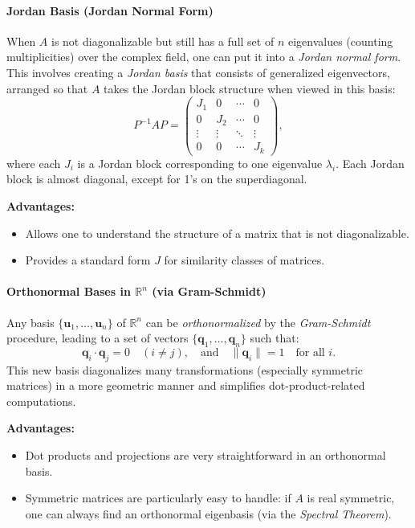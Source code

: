 \paragraph{Jordan Basis (Jordan Normal Form)}

\noindent
When $A$ is not diagonalizable but still has a full set of $n$ eigenvalues 
(counting multiplicities) over the complex field, one can put it into a \emph{Jordan normal form}. 
This involves creating a \emph{Jordan basis} that consists of generalized eigenvectors, 
arranged so that $A$ takes the Jordan block structure when viewed in this basis:
\[
  P^{-1} A P = 
  \begin{pmatrix}
  J_1 & 0   & \cdots & 0 \\
  0   & J_2 & \cdots & 0 \\
  \vdots & \vdots & \ddots & \vdots \\
  0 & 0 & \cdots & J_k
  \end{pmatrix},
\]
where each $J_i$ is a Jordan block corresponding to one eigenvalue $\lambda_i$. 
Each Jordan block is almost diagonal, except for 1’s on the superdiagonal.

\noindent
\textbf{Advantages:}
\begin{itemize}
\item Allows one to understand the structure of a matrix that is not diagonalizable.
\item Provides a standard form $J$ for similarity classes of matrices.
\end{itemize}

\paragraph{Orthonormal Bases in $\mathbb{R}^n$ (via Gram-Schmidt)}

\noindent
Any basis $\{\mathbf{u}_1,\dots,\mathbf{u}_n\}$ of $\mathbb{R}^n$ can be \emph{orthonormalized} 
by the \emph{Gram-Schmidt} procedure, leading to a set of vectors 
$\{\mathbf{q}_1,\dots,\mathbf{q}_n\}$ such that:
\[
  \mathbf{q}_i \cdot \mathbf{q}_j = 0 \quad (i \neq j), 
  \quad\text{and}\quad
  \|\mathbf{q}_i\| = 1 \quad \text{for all } i.
\]
This new basis diagonalizes many transformations (especially symmetric matrices) 
in a more geometric manner and simplifies dot-product-related computations.

\noindent
\textbf{Advantages:}
\begin{itemize}
\item Dot products and projections are very straightforward in an orthonormal basis.
\item Symmetric matrices are particularly easy to handle: if $A$ is real symmetric, 
  one can always find an orthonormal eigenbasis (via the \emph{Spectral Theorem}).
\end{itemize}

